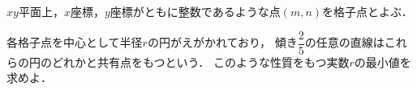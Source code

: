 \documentclass[../../main.tex]{subfiles}
\begin{document}
$xy$平面上，$x$座標，$y$座標がともに整数であるような点$(m,n)$を格子点とよぶ．

各格子点を中心として半径$r$の円がえがかれており，
傾き$\displaystyle\dfrac{2}{5}$の任意の直線はこれらの円のどれかと共有点をもつという．
このような性質をもつ実数$r$の最小値を求めよ．
\end{document}

